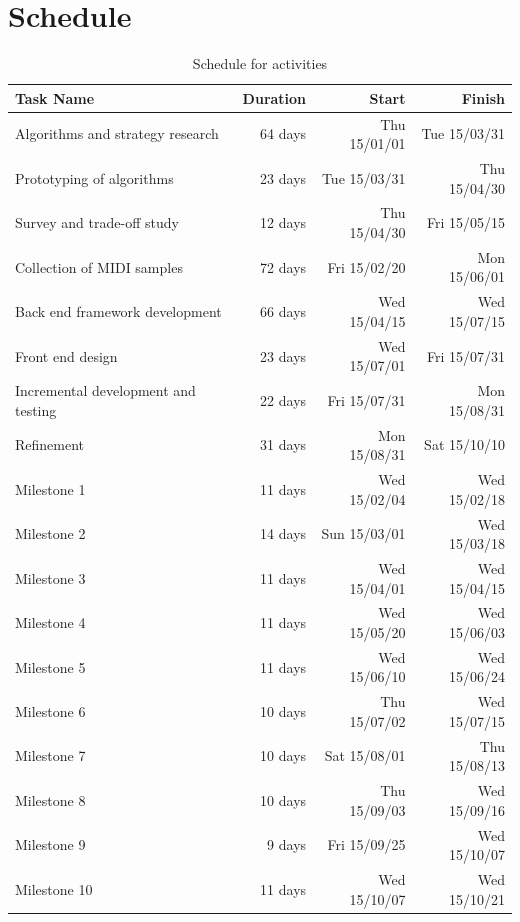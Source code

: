 \section{Schedule}
\begin{table}[htbp]
  \centering
  \caption{Schedule for activities}
    \begin{tabular}{lrrr}
    \toprule
    Task Name & Duration & Start & Finish \\
    \midrule
    Algorithms and strategy research & 64 days & Thu 15/01/01 & Tue 15/03/31 \\
    Prototyping of algorithms & 23 days & Tue 15/03/31 & Thu 15/04/30 \\
    Survey and trade-off study & 12 days & Thu 15/04/30 & Fri 15/05/15 \\
    Collection of MIDI samples & 72 days & Fri 15/02/20 & Mon 15/06/01 \\
    Back end framework development & 66 days & Wed 15/04/15 & Wed 15/07/15 \\
    Front end design & 23 days & Wed 15/07/01 & Fri 15/07/31 \\
    Incremental development and testing & 22 days & Fri 15/07/31 & Mon 15/08/31 \\
    Refinement & 31 days & Mon 15/08/31 & Sat 15/10/10 \\
    Milestone 1 & 11 days & Wed 15/02/04 & Wed 15/02/18 \\
    Milestone 2 & 14 days & Sun 15/03/01 & Wed 15/03/18 \\
    Milestone 3 & 11 days & Wed 15/04/01 & Wed 15/04/15 \\
    Milestone 4 & 11 days & Wed 15/05/20 & Wed 15/06/03 \\
    Milestone 5 & 11 days & Wed 15/06/10 & Wed 15/06/24 \\
    Milestone 6 & 10 days & Thu 15/07/02 & Wed 15/07/15 \\
    Milestone 7 & 10 days & Sat 15/08/01 & Thu 15/08/13 \\
    Milestone 8 & 10 days & Thu 15/09/03 & Wed 15/09/16 \\
    Milestone 9 & 9 days & Fri 15/09/25 & Wed 15/10/07 \\
    Milestone 10 & 11 days & Wed 15/10/07 & Wed 15/10/21 \\
    \bottomrule
    \end{tabular}%
  \label{tab:sched}%
\end{table}%

